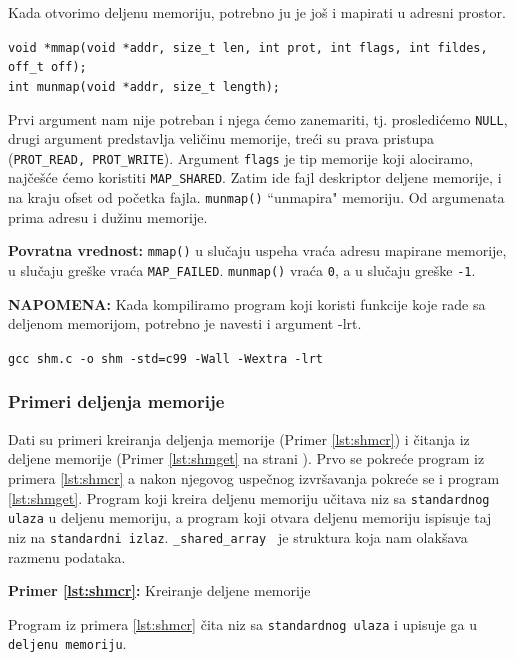 \documentclass[a4paper, 11pt, twoside]{article}
\newcommand{\scode}[3] {
	\hspace{.06\textwidth} 
	\begin{minipage}[t]{.88\textwidth} %
		\begin{mdframed}[topline=true,bottomline=true,leftline=true,rightline=true,backgroundcolor=gray!22, linecolor=gray!60!black,roundcorner=1mm]
			 

	\begin{center}
		\caption{\textbf{Primer \ref{lst:#3}:} #2}
	\end{center}
	\end{mdframed}
	\end{minipage}

}
\begin{document}
Kada otvorimo deljenu memoriju, potrebno ju je još i mapirati u adresni prostor.

\begin{center}
	\texttt{void *mmap(void *addr, size\_t len, int prot, int flags, int fildes, off\_t off);} \\
	\texttt{int munmap(void *addr, size\_t length);}
\end{center}

Prvi argument nam nije potreban i njega ćemo zanemariti, tj. prosledićemo \texttt{NULL}, drugi argument predstavlja veličinu memorije, treći su prava pristupa (\texttt{PROT\_READ, PROT\_WRITE}). Argument \texttt{flags} je tip memorije koji alociramo, najčešće ćemo koristiti \texttt{MAP\_SHARED}. Zatim ide fajl deskriptor deljene memorije, i na kraju ofset od početka fajla. \texttt{munmap()} ``unmapira" memoriju. Od argumenata prima adresu i dužinu memorije. 

\textbf{Povratna vrednost:} \texttt{mmap()} u slučaju uspeha vraća adresu mapirane memorije, u slučaju greške vraća \texttt{MAP\_FAILED}. \texttt{munmap()} vraća \texttt{0}, a u slučaju greške \texttt{-1}.

\vspace{2mm} 
\textbf{NAPOMENA:} Kada kompiliramo program koji koristi funkcije koje rade sa deljenom memorijom, potrebno je navesti i argument -lrt. 

 \begin{center}
	\texttt{gcc shm.c -o shm -std=c99 -Wall -Wextra -lrt} 
\end{center}
\newpage
\subsubsection{Primeri deljenja memorije}

Dati su primeri kreiranja deljenja memorije (Primer \ref{lst:shmcr}) i čitanja iz deljene memorije (Primer \ref{lst:shmget} na strani \pageref{lst:shmget}). Prvo se pokreće program iz primera \ref{lst:shmcr} a nakon njegovog uspečnog izvršavanja pokreće se i program \ref{lst:shmget}. Program koji kreira deljenu memoriju učitava niz sa \texttt{standardnog ulaza} u deljenu memoriju, a program koji otvara deljenu memoriju ispisuje taj niz na \texttt{standardni izlaz}. \texttt{\_shared\_array } je struktura koja nam olakšava razmenu podataka.
\vspace{2mm} 

\scode{shmcreate.c}{Kreiranje deljene memorije}{shmcr}

\vspace{5mm} 
Program iz primera \ref{lst:shmcr} čita niz sa \texttt{standardnog ulaza} i upisuje ga u \texttt{deljenu memoriju}.
\end{document}
